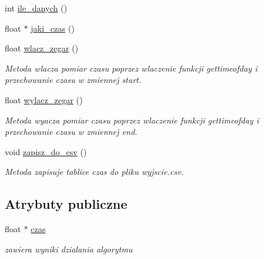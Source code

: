 \begin{DoxyCompactItemize}
int \hyperlink{classalgorytm_acbd9260a0b2055acee485f737b960992}{ile\-\_\-danych} ()
\item 
float $\ast$ \hyperlink{classalgorytm_adcd99d6f8b10e222f47fd61328b84c67}{jaki\-\_\-czas} ()
\item 
float \hyperlink{classalgorytm_a24d2f97e025292bb4ac297f73fb957d3}{wlacz\-\_\-zegar} ()
\begin{DoxyCompactList}\small\item\em \-Metoda wlacza pomiar czasu poprzez wlaczenie funkcji {\ttfamily gettimeofday} i przechowanie czasu w zmiennej {\ttfamily start}. \end{DoxyCompactList}\item 
float \hyperlink{classalgorytm_a2138e99c4a4c10b366b4dcea37aa7d00}{wylacz\-\_\-zegar} ()
\begin{DoxyCompactList}\small\item\em \-Metoda wyacza pomiar czasu poprzez wlaczenie funkcji {\ttfamily gettimeofday} i przechowanie czasu w zmiennej {\ttfamily end}. \end{DoxyCompactList}\item 
void \hyperlink{classalgorytm_aa590cd612d8b1f9e836c0c1c369d04ce}{zapisz\-\_\-do\-\_\-csv} ()
\begin{DoxyCompactList}\small\item\em \-Metoda zapisuje tablice {\ttfamily czas} do pliku {\ttfamily wyjscie.\-csv}. \end{DoxyCompactList}\end{DoxyCompactItemize}
\subsection*{\-Atrybuty publiczne}
\begin{DoxyCompactItemize}
\item 
float $\ast$ \hyperlink{classalgorytm_a8005d5f3266848b756400e3bb189de58}{czas}
\begin{DoxyCompactList}\small\item\em zawiera wyniki dzialania algorytmu \end{DoxyCompactList}\end{DoxyCompactItemize}
